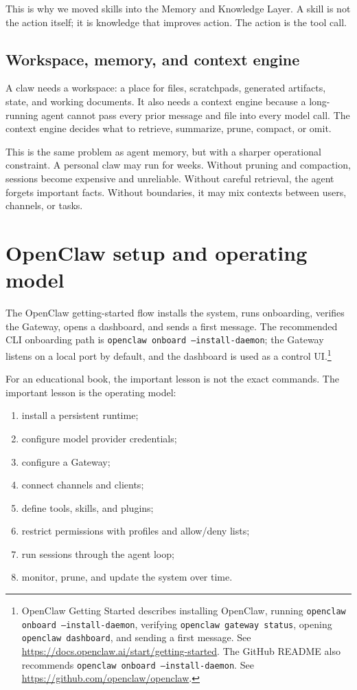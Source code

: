 This is why we moved skills into the Memory and Knowledge Layer. A skill is not the action itself; it is knowledge that improves action. The action is the tool call.

\subsection{Workspace, memory, and context engine}

A claw needs a workspace: a place for files, scratchpads, generated artifacts, state, and working documents. It also needs a context engine because a long-running agent cannot pass every prior message and file into every model call. The context engine decides what to retrieve, summarize, prune, compact, or omit.

This is the same problem as agent memory, but with a sharper operational constraint. A personal claw may run for weeks. Without pruning and compaction, sessions become expensive and unreliable. Without careful retrieval, the agent forgets important facts. Without boundaries, it may mix contexts between users, channels, or tasks.

\section{OpenClaw setup and operating model}

The OpenClaw getting-started flow installs the system, runs onboarding, verifies the Gateway, opens a dashboard, and sends a first message. The recommended CLI onboarding path is \texttt{openclaw onboard --install-daemon}; the Gateway listens on a local port by default, and the dashboard is used as a control UI.\footnote{OpenClaw Getting Started describes installing OpenClaw, running \texttt{openclaw onboard --install-daemon}, verifying \texttt{openclaw gateway status}, opening \texttt{openclaw dashboard}, and sending a first message. See \url{https://docs.openclaw.ai/start/getting-started}. The GitHub README also recommends \texttt{openclaw onboard --install-daemon}. See \url{https://github.com/openclaw/openclaw}.}

For an educational book, the important lesson is not the exact commands. The important lesson is the operating model:

\begin{enumerate}[leftmargin=*]
  \item install a persistent runtime;
  \item configure model provider credentials;
  \item configure a Gateway;
  \item connect channels and clients;
  \item define tools, skills, and plugins;
  \item restrict permissions with profiles and allow/deny lists;
  \item run sessions through the agent loop;
  \item monitor, prune, and update the system over time.
\end{enumerate}

